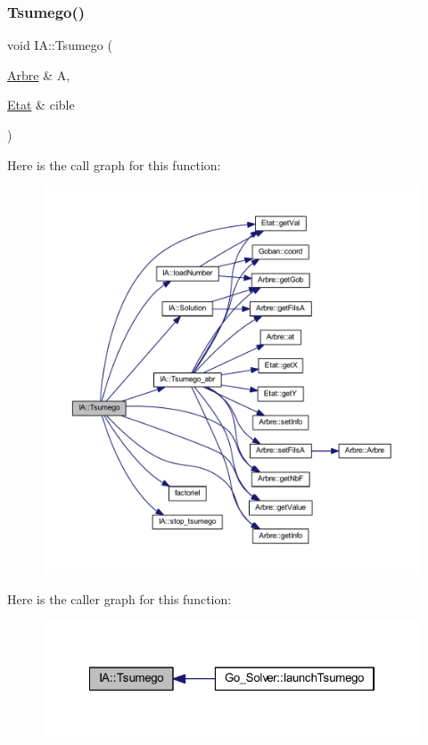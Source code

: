 \subsubsection{\texorpdfstring{Tsumego()}{Tsumego()}}
{\footnotesize\ttfamily void I\+A\+::\+Tsumego (\begin{DoxyParamCaption}\item[{\hyperlink{class_arbre}{Arbre} \&}]{A,  }\item[{\hyperlink{class_etat}{Etat} \&}]{cible }\end{DoxyParamCaption})\hspace{0.3cm}{\ttfamily [static]}}

Here is the call graph for this function\+:
\nopagebreak
\begin{figure}[H]
\begin{center}
\leavevmode
\includegraphics[width=350pt]{class_i_a_a364aef554d81e9a93bff08c28d437497_cgraph}
\end{center}
\end{figure}
Here is the caller graph for this function\+:
\nopagebreak
\begin{figure}[H]
\begin{center}
\leavevmode
\includegraphics[width=322pt]{class_i_a_a364aef554d81e9a93bff08c28d437497_icgraph}
\end{center}
\end{figure}
\mbox{\label{class_i_a_af1f6e5abe41a2225b17ca319c1fc0e4e}} 
